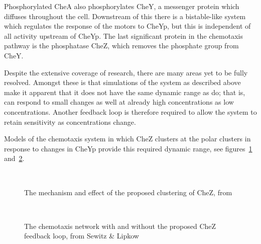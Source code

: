 \documentclass[../main.tex]{subfiles}
\begin{document}
Phosphorylated CheA also phosphorylates CheY, a messenger protein which diffuses throughout the cell. Downstream of this there is a bistable-like system which regulates the response of the motors to CheYp, but this is independent of all activity upstream of CheYp. The last significant protein in the \ecoli chemotaxis pathway is the phosphatase CheZ, which removes the phosphate group from CheY.

Despite the extensive coverage of research, there are many areas yet to be fully resolved. Amongst these is that simulations of the system as described above make it apparent that it does not have the same dynamic range as \ecoli do; that is, \ecoli can respond to small changes as well at already high concentrations as low concentrations. Another feedback loop is therefore required to allow the system to retain sensitivity as concentrations change.

Models of the chemotaxis system in which CheZ clusters at the polar clusters in response to changes in CheYp provide this required dynamic range, see figures~\ref{fig:intro:chemo} and~\ref{fig:intro:netwok}.

\begin{figure}[h!]
\begin{center}
\label{fig:intro:chemo:mech}\\
\caption[Proposed mechanism of CheZ clustering]{The mechanism and effect of the proposed clustering of CheZ, from \citet{lipkowfigs}}
\label{fig:intro:chemo}
\end{center}
\end{figure}

\begin{figure}[h!]
\begin{center}
\\
\caption[Modified chemotaxis network]{The chemotaxis network with and without the proposed CheZ feedback loop, from Sewitz \& Lipkow\citep{lipkowfigs}}
\label{fig:intro:netwok}
\end{center}
\end{figure}
\end{document}
